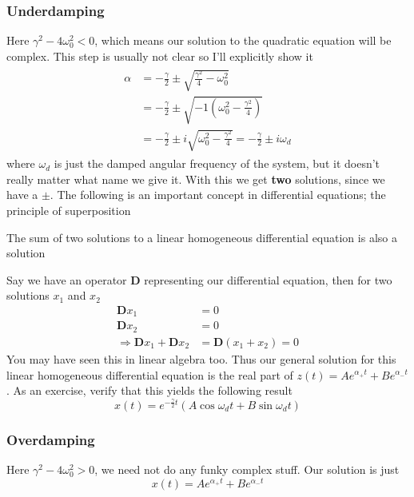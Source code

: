 \documentclass{report}
\numberwithin{equation}{section}
\begin{document}
\subsubsection{Underdamping}
Here $\gamma^2 - 4\omega_0^2 < 0$, which means our solution to the quadratic equation will be complex. This step is usually not clear so I'll explicitly show it
\begin{align}
\begin{split}
	\alpha &= -\frac{\gamma}{2} \pm \sqrt{\frac{\gamma^2}{4} - \omega_0^2}\\
	&= -\frac{\gamma}{2} \pm \sqrt{-1\left(\omega_0^2 - \frac{\gamma^2}{4}\right)}\\
	&= -\frac{\gamma}{2} \pm i\sqrt{\omega_0^2 - \frac{\gamma^2}{4}} = -\frac{\gamma}{2} \pm i\omega_d
\end{split}
\end{align}
where $\omega_d$ is just the damped angular frequency of the system, but it doesn't really matter what name we give it. With this we get \textbf{two} solutions, since we have a $\pm$. The following is an important concept in differential equations; the principle of superposition
\begin{center}
	The sum of two solutions to a linear homogeneous differential equation is also a solution
\end{center}
Say we have an operator $\textbf{D}$ representing our differential equation, then for two solutions $x_1$ and $x_2$
\begin{align*}
	\textbf{D}x_1 &= 0\\
	\textbf{D}x_2 &= 0\\
	\Rightarrow\textbf{D}x_1 + \textbf{D}x_2 &= \textbf{D}(x_1 + x_2) = 0
\end{align*}
You may have seen this in linear algebra too. Thus our general solution for this linear homogeneous differential equation is the real part of $z(t) = Ae^{\alpha_+t} + Be^{\alpha_-t}$. As an exercise, verify that this yields the following result
\begin{equation}
	x(t) = e^{-\frac{\gamma}{2}t}\left(A\cos\omega_dt +  B\sin\omega_d t\right)
\end{equation}
\subsubsection{Overdamping}
Here $\gamma^2 - 4\omega_0^2 > 0$, we need not do any funky complex stuff. Our solution is just
\begin{equation}
	x(t) = Ae^{\alpha_+ t}+Be^{\alpha_- t}
\end{equation}
\end{document}
